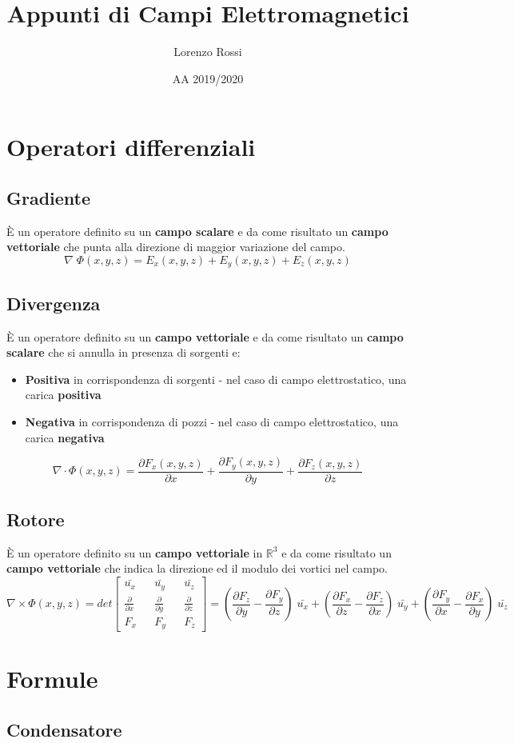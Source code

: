 \documentclass{article}
\title{Appunti di Campi Elettromagnetici}
\author{Lorenzo Rossi}
\date{AA 2019/2020}
\begin{document}
\maketitle
\section{Operatori differenziali}

\subsection{Gradiente}
\`E un operatore definito su un \textbf{campo scalare} e da come risultato un \textbf{campo vettoriale} che punta alla direzione di maggior variazione del campo.
\[ \nabla \; \Phi (x, y, z) = E_x(x, y, z) + E_y(x, y, z) + E_z(x, y, z) \]

\subsection{Divergenza}
\`E un operatore definito su un \textbf{campo vettoriale} e da come risultato un \textbf{campo scalare} che si annulla in presenza di sorgenti e:
\begin{itemize}
	\item \textbf{Positiva} in corrispondenza di sorgenti - nel caso di campo elettrostatico, una carica \textbf{positiva}
	\item \textbf{Negativa} in corrispondenza di pozzi - nel caso di campo elettrostatico, una carica \textbf{negativa}
\end{itemize}
\[ \nabla \cdot \Phi (x, y, z) = \frac{\partial F_x(x, y, z)}{\partial x} + \frac{\partial F_y(x, y, z)}{\partial y} + \frac{\partial F_z(x, y, z)}{\partial z} \]

\subsection{Rotore}
\`E un operatore definito su un \textbf{campo vettoriale} in \( \mathbb{R} ^ 3 \) e da come risultato un \textbf{campo vettoriale} che indica la direzione ed il modulo dei vortici nel campo.
\[ \nabla \times \Phi (x, y, z) = det  \begin{bmatrix} \bar{u_x} && \bar{u_y} && \bar{u_z} \\ \frac{\partial }{\partial x} && \frac{\partial }{\partial y} && \frac{\partial }{\partial z} \\ F_x && F_y && F_z  \end{bmatrix} = (\frac{\partial F_z}{\partial y} - \frac{\partial F_y}{\partial z}) \; \bar{u_x} + (\frac{\partial F_x}{\partial z} - \frac{\partial F_z}{\partial x}) \; \bar{u_y} + (\frac{\partial F_y}{\partial x} - \frac{\partial F_x}{\partial y}) \; \bar{u_z} \]


\section{Formule}

\subsection{Condensatore}
\end{document}
